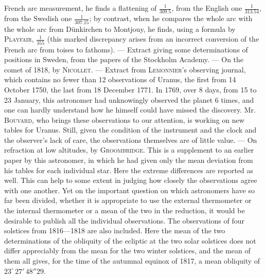 French arc measurement, he finds a flattening of $\frac{1}{309.5}$, from the English one $\frac{1}{313.54}$, from the Swedish one $\frac{1}{307.15}$; by contrast, when he compares the whole arc with the whole arc from Dünkirchen to Montjouy, he finds, using a formula by \textsc{Playfair}, $\frac{1}{355}$ (this marked discrepancy arises from an incorrect conversion of the French arc from toises to fathoms). --- Extract giving some determinations of positions in Sweden, from the papers of the Stockholm Academy. --- On the comet of 1818, by \textsc{Nicollet}. --- Extract from \textsc{Lemonnier}'s observing journal, which contains no fewer than 12 observations of Uranus, the first from 14 October 1750, the last from 18 December 1771. In 1769, over 8 days, from 15 to 23 January, this astronomer had unknowingly observed the planet 6 times, and one can hardly understand how he himself could have missed the discovery. Mr. \textsc{Bouvard}, who brings these observations to our attention, is working on new tables for Uranus. Still, given the condition of the instrument and the clock and the observer's lack of care, the observations themselves are of little value. --- On refraction at low altitudes, by \textsc{Groombridge}. This is a supplement to an earlier paper by this astronomer, in which he had given only the mean deviation from his tables for each individual star. Here the extreme differences are reported as well. This can help to some extent in judging how closely the observations agree with one another. Yet on the important question on which astronomers have so far been divided, whether it is appropriate to use the external thermometer or the internal thermometer or a mean of the two in the reduction, it would be desirable to publish all the individual observations. The observations of four solstices from 1816---1818 are also included. Here the mean of the two determinations of the obliquity of the ecliptic at the two solar solstices does not differ appreciably from the mean for the two winter solstices, and the mean of them all gives, for the time of the autumnal equinox of 1817, a mean obliquity of $23^\circ\,27'\,48''29$.
\par\clearpage\endgroup
